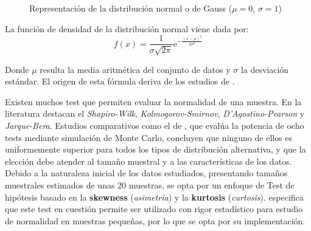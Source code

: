 \begin{figure}[h]
\centering
{}
\caption{Representación de la distribución normal o de Gauss 
($\mu=0$, $\sigma=1$)}
\par\vspace{2pt}{\footnotesize Fuente: elaboración propia.}\label{fig:gaussian}
\end{figure}



La función de densidad de la distribución normal viene dada por:
\begin{equation}
f(x)=\frac{1}{\sigma\sqrt{2\pi}}
\mathrm{e}^{-\frac{(x-\mu)^2}{2\sigma^2}}
\end{equation}


Donde $\mu$ resulta la media aritmética del conjunto de datos y $\sigma$ la desviación estándar.
El origen de esta fórmula deriva de los estudios de \textcite{demoivre1738doctrine,
 laplace1812theorie, gauss1809theoria}. 

 Existen muchos test que permiten evaluar la normalidad de una muestra. En la literatura destacan el 
 \textit{Shapiro-Wilk}, \textit{Kolmogorov-Smirnov}, \textit{D'Agostino-Pearson} y \textit{Jarque-Bera}.
 Estudios comparativos como el de \textcite{yap2011comparisons}, que evalúa la potencia de ocho tests mediante 
 simulación de Monte Carlo, concluyen que ninguno de ellos es uniformemente superior para todos los tipos de 
 distribución alternativa, y que la elección debe atender al tamaño muestral y a las características de los
 datos. Debido a la naturaleza inicial de los datos estudiados, presentando tamaños muestrales estimados
 de unas 20 muestras, se opta por un enfoque de Test de hipótesis basado en la \textbf{skewness}
 (\textit{asimetría}) y la \textbf{kurtosis} (\textit{curtosis}).
 \textcite{kim2013normality} especifica que este test en cuestión permite
 ser utilizado con rigor estadístico para estudio de normalidad en muestras pequeñas, por lo que se opta
 por su implementación.

